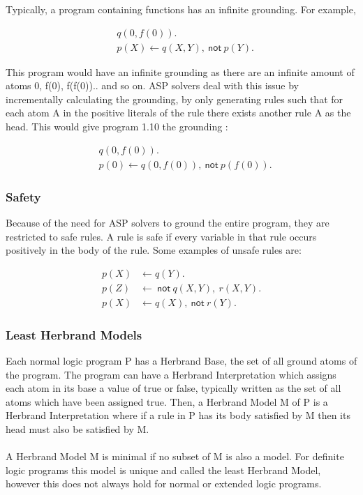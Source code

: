 Typically, a program containing functions has an infinite grounding. For example, 

\begin{align*}
&q(0, f(0)). \\
&p(X) \gets q(X,Y), \: \textsf{not} \: p(Y).
\end{align*}

This program would have an infinite grounding as there are an infinite amount of atoms 0, f(0), f(f(0)).. and so on. ASP solvers deal with this issue by incrementally calculating the grounding, by only generating rules such that for each atom A in the positive literals of the rule there exists another rule A as the head. This would give program 1.10 the grounding :

\begin{align*}
&q(0, f(0)). \\
&p(0) \gets q(0, f(0)), \: \textsf{not} \: p(f(0)).
\end{align*}

\subsubsection{Safety}

Because of the need for ASP solvers to ground the entire program, they are restricted to safe rules. A rule is safe if every variable in that rule occurs positively in the body of the rule. Some examples of unsafe rules are:

\begin{align*}
p(X) &\gets q(Y). \\
p(Z) &\gets \: \textsf{not} \: q(X,Y), \: r(X,Y). \\
p(X) &\gets q(X), \: \textsf{not} \: r(Y).
\end{align*}

\subsubsection{Least Herbrand Models}

Each normal logic program P has a Herbrand Base, the set of all ground atoms of the program. The program can have a Herbrand Interpretation which assigns each atom in its base a value of true or false, typically written as the set of all atoms which have  been assigned true. Then, a Herbrand Model M of P is a Herbrand Interpretation where if a rule in P has its body satisfied by M then its head must also be satisfied by M. \\ \\
A Herbrand Model M is minimal if no subset of M is also a model. For definite logic programs this model is unique and called the least Herbrand Model, however this does not always hold for normal or extended logic programs.

